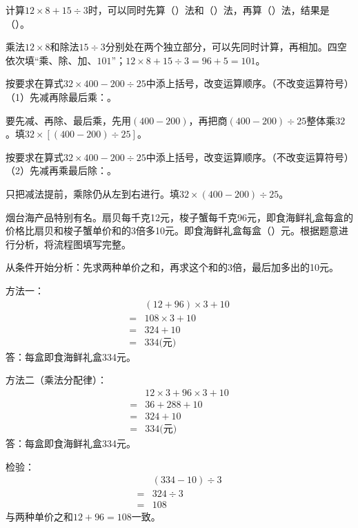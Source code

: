 计算\(12\times8+15\div3\)时，可以同时先算（\hspace{1.8em}）法和（\hspace{1.8em}）法，再算（\hspace{1.8em}）法，结果是（\hspace{1.8em}）。\par
\begin{BookAnswer}
乘法\(12\times8\)和除法\(15\div3\)分别处在两个独立部分，可以先同时计算，再相加。四空依次填“乘、除、加、\(101\)”；\allowbreak{}\(12\times8+15\div3=96+5=101\)。
\end{BookAnswer}

按要求在算式\(32\times400-200\div25\)中添上括号，改变运算顺序。（不改变运算符号）（1）先减再除最后乘：\BookBlank{}。\par
\begin{BookAnswer}
要先减、再除、最后乘，先用\((400-200)\)，再把商\((400-200)\div25\)整体乘\(32\)。填\(32\times[(400-200)\div25]\)。
\end{BookAnswer}

按要求在算式\(32\times400-200\div25\)中添上括号，改变运算顺序。（不改变运算符号）（2）先减再乘最后除：\BookBlank{}。\par
\begin{BookAnswer}
只把减法提前，乘除仍从左到右进行。填\(32\times(400-200)\div25\)。
\end{BookAnswer}

烟台海产品特别有名。扇贝每千克12元，梭子蟹每千克96元，即食海鲜礼盒每盒的价格比扇贝和梭子蟹单价和的3倍多10元。即食海鲜礼盒每盒（\hspace{1.8em}）元。根据题意进行分析，将流程图填写完整。\par
{}
\begin{BookAnswer}
从条件开始分析：先求两种单价之和，再求这个和的3倍，最后加多出的10元。\par 方法一：\[\begin{aligned}&(12+96)\times3+10\\={}&108\times3+10\\={}&324+10\\={}&334\text{(元)}\end{aligned}\]答：每盒即食海鲜礼盒334元。\par 方法二（乘法分配律）：\[\begin{aligned}&12\times3+96\times3+10\\={}&36+288+10\\={}&324+10\\={}&334\text{(元)}\end{aligned}\]答：每盒即食海鲜礼盒334元。\par 检验：\[\begin{aligned}&(334-10)\div3\\={}&324\div3\\={}&108\end{aligned}\]与两种单价之和\(12+96=108\)一致。
\end{BookAnswer}

